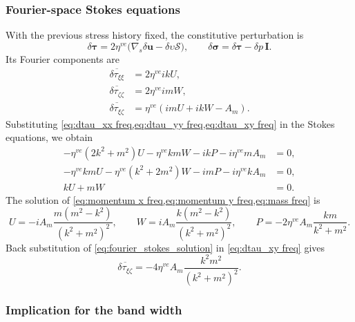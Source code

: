 \documentclass{article}
\begin{document}
\subsubsection{Fourier-space Stokes equations}

With the previous stress history fixed, the constitutive perturbation is
\[
  \delta\bm\tau
     =2\eta^{ve}\bigl(\nabla_s\delta\bm u
                          -\delta\upsilon\bm{\mathcal S}\bigr),
  \qquad
  \delta\bm\sigma=\delta\bm\tau-\delta p\,\bm I.
\]
Its Fourier components are
\begin{subequations}
  \begin{align}
    \overline{\delta\tau_{\xi\xi}}&=2\eta^{ve} ikU,
    \label{eq:dtau_xx freq}\\
    \overline{\delta\tau_{\zeta\zeta}}&=2\eta^{ve} imW,
    \label{eq:dtau_yy freq}\\
    \overline{\delta\tau_{\xi\zeta}}&=\eta^{ve}(imU+ikW-A_m).
    \label{eq:dtau_xy freq}
  \end{align}
\end{subequations}
Substituting \cref{eq:dtau_xx freq,eq:dtau_yy freq,eq:dtau_xy freq} in the 
Stokes equations, we obtain
\begin{subequations}
  \begin{align}
    -\eta^{ve}(2k^2+m^2)U-\eta^{ve} kmW-ikP-i\eta^{ve} mA_m&=0,
    \label{eq:momentum x freq}\\
    -\eta^{ve} kmU-\eta^{ve}(k^2+2m^2)W-imP-i\eta^{ve} kA_m&=0,
    \label{eq:momentum y freq}\\
    kU+mW&=0.\label{eq:mass freq}
  \end{align}
\end{subequations}
The solution of \cref{eq:momentum x freq,eq:momentum y freq,eq:mass freq} is
\begin{equation}\label{eq:fourier_stokes_solution}
  U=-iA_m\frac{m(m^2-k^2)}{(k^2+m^2)^2},\qquad
  W= iA_m\frac{k(m^2-k^2)}{(k^2+m^2)^2},\qquad
  P=-2\eta^{ve} A_m\frac{km}{k^2+m^2}.
\end{equation}
Back substitution of \eqref{eq:fourier_stokes_solution} in 
\eqref{eq:dtau_xy freq} gives
\begin{equation}\label{eq:fourier_shear_response}
  \overline{\delta\tau_{\xi\zeta}} = -4\eta^{ve} A_m\frac{k^2m^2}{(k^2+m^2)^2}.
\end{equation}

\subsubsection{Implication for the band width}
\end{document}
